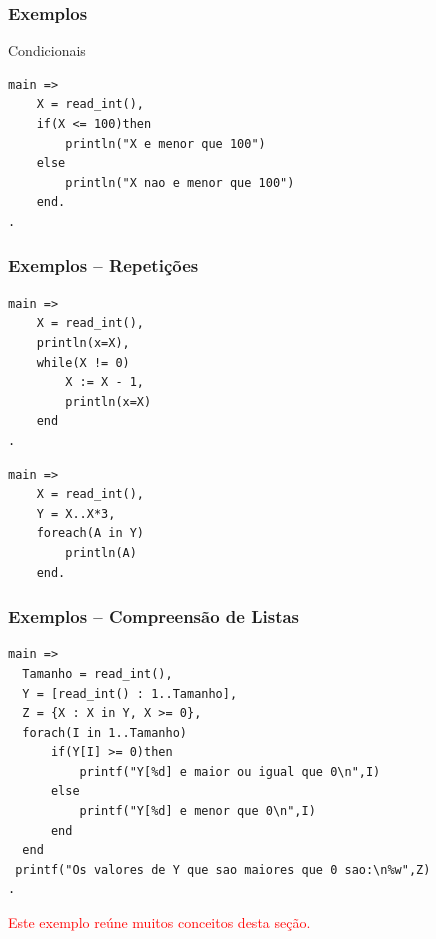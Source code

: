 
\begin{frame}[fragile]

\frametitle{Exemplos}
    
    \begin{block}{Condicionais}
        \begin{lstlisting}[frame=single]
main =>
    X = read_int(),
    if(X <= 100)then
        println("X e menor que 100")
    else
        println("X nao e menor que 100")
    end.
.
        \end{lstlisting}
    
    \end{block}
\end{frame}

\begin{frame}[fragile]

\frametitle{Exemplos -- Repetições}
    
   \begin{lstlisting}[frame=single]
main =>
    X = read_int(),
    println(x=X),
    while(X != 0)
        X := X - 1,
        println(x=X)
    end
.
   \end{lstlisting}
        
   \begin{lstlisting}[frame=single]
main =>
    X = read_int(),
    Y = X..X*3,
    foreach(A in Y)
        println(A)
    end.
        \end{lstlisting}
    
\end{frame}

\begin{frame}[fragile]
\frametitle{Exemplos -- Compreensão de Listas}    
       
 \begin{lstlisting}[frame=single]
main => 
  Tamanho = read_int(),
  Y = [read_int() : 1..Tamanho],
  Z = {X : X in Y, X >= 0},
  forach(I in 1..Tamanho)
      if(Y[I] >= 0)then
          printf("Y[%d] e maior ou igual que 0\n",I)
      else
          printf("Y[%d] e menor que 0\n",I)
      end
  end
 printf("Os valores de Y que sao maiores que 0 sao:\n%w",Z)
.
\end{lstlisting} 
       
\textcolor{red}{Este exemplo reúne muitos conceitos desta seção.}       
   
\end{frame}


